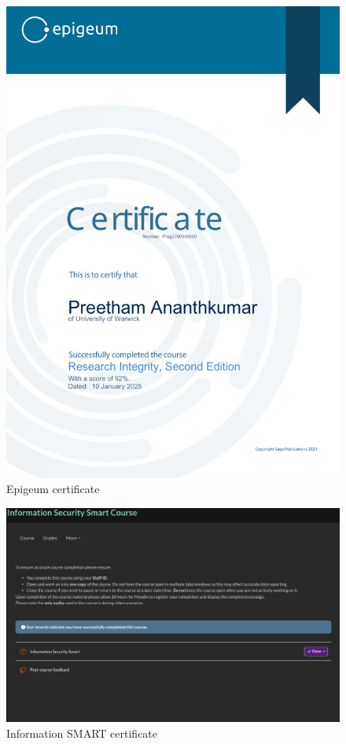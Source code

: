 \begin{figure}[htbp]
    \centering
    \includegraphics[width=1\textwidth]{images/epigeum-certificate.png}
    \caption{Epigeum certificate}
\end{figure}

\begin{figure}[htbp]
    \centering
    \includegraphics[width=1\textwidth]{images/information-security-smart-certificate.png}
    \caption{Information SMART certificate}
\end{figure}

